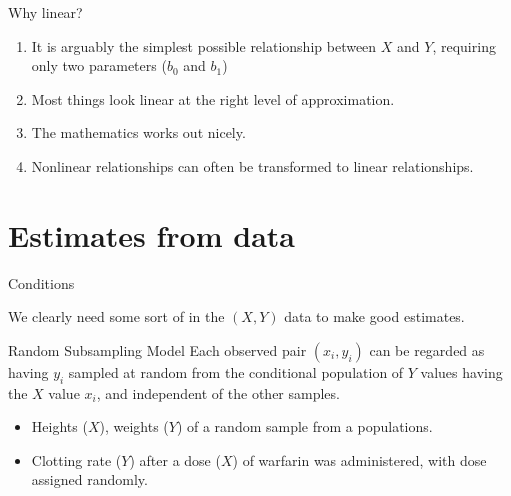 \begin{frame}{Why linear?}

  \begin{enumerate}
      
    \item It is arguably the simplest possible relationship between $X$ and $Y$,
      requiring only two parameters ($b_0$ and $b_1$)

    \item Most things look linear at the right level of approximation.

    \item The mathematics works out nicely.

    \item Nonlinear relationships can often be transformed to linear relationships.

  \end{enumerate}

\end{frame}


\section{Estimates from data}


\begin{frame}{Conditions}

  We clearly need some sort of  in the $(X,Y)$ data to make good estimates.

    \vspace{2em}

    \begin{block}{Random Subsampling Model}
      Each observed pair $(x_i,y_i)$ can be regarded as having $y_i$ sampled
      at random from the \alert{conditional} population of $Y$ values having the $X$ value $x_i$,
      and independent of the other samples.
    \end{block}

    \vspace{2em}

    \begin{itemize}
      \item Heights ($X$), weights ($Y$) of a random sample from a populations.
      \item Clotting rate ($Y$) after a dose ($X$) of warfarin was administered,
        with dose assigned randomly.
    \end{itemize}

\end{frame}

